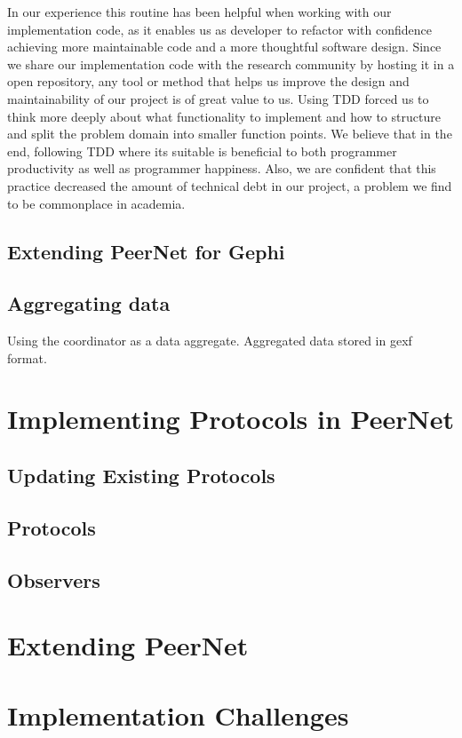 \documentclass[UKenglish, a4paper]{ifimaster}
\begin{document}
        In our experience this routine has been helpful when working
        with our implementation code, as it enables us as developer to
        refactor with confidence achieving more maintainable code and a
        more thoughtful software design. Since we share our
        implementation code with the research community by hosting it in
        a open repository, any tool or method that helps us improve the
        design and maintainability of our project is of great value to
        us. Using TDD forced us to think more deeply about what
        functionality to implement and how to structure and split the
        problem domain into smaller function points. We believe that in
        the end, following TDD where its suitable is beneficial to both
        programmer productivity as well as programmer happiness. Also,
        we are confident that this practice decreased the amount of
        technical debt in our project, a problem we find to be commonplace in academia.

        \subsection{Extending PeerNet for Gephi}
        \subsection{Aggregating data}
            Using the coordinator as a data aggregate. Aggregated data
            stored in gexf format.
    \section{Implementing Protocols in PeerNet}
        \subsection{Updating Existing Protocols}
        \subsection{Protocols}
        \subsection{Observers}
    \section{Extending PeerNet}
    \section{Implementation Challenges}
\end{document}
